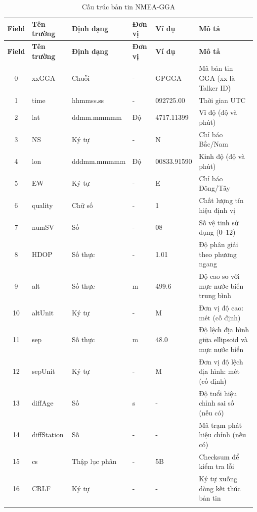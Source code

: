 \documentclass[../DoAn.tex]{subfiles}
\begin{document}
\begin{longtable}{|c|l|l|l|l|p{4cm}|}
\hline
\textbf{Field} & \textbf{Tên trường} & \textbf{Định dạng} & \textbf{Đơn vị} & \textbf{Ví dụ} & \textbf{Mô tả} \\
\hline
\endfirsthead

\hline
\textbf{Field} & \textbf{Tên trường} & \textbf{Định dạng} & \textbf{Đơn vị} & \textbf{Ví dụ} & \textbf{Mô tả} \\
\hline
\endhead

\hline
\endfoot

\endlastfoot

0 & xxGGA & Chuỗi & - & GPGGA & Mã bản tin GGA (xx là Talker ID) \\ \hline
1 & time & hhmmss.ss & - & 092725.00 & Thời gian UTC \\ \hline
2 & lat & ddmm.mmmmm & Độ & 4717.11399 & Vĩ độ (độ và phút) \\ \hline
3 & NS & Ký tự & - & N & Chỉ báo Bắc/Nam \\ \hline
4 & lon & dddmm.mmmmm & Độ & 00833.91590 & Kinh độ (độ và phút) \\ \hline
5 & EW & Ký tự & - & E & Chỉ báo Đông/Tây \\ \hline
6 & quality & Chữ số & - & 1 & Chất lượng tín hiệu định vị \\ \hline
7 & numSV & Số & - & 08 & Số vệ tinh sử dụng (0–12) \\ \hline
8 & HDOP & Số thực & - & 1.01 & Độ phân giải theo phương ngang \\ \hline
9 & alt & Số thực & m & 499.6 & Độ cao so với mực nước biển trung bình \\ \hline
10 & altUnit & Ký tự & - & M & Đơn vị độ cao: mét (cố định) \\ \hline
11 & sep & Số thực & m & 48.0 & Độ lệch địa hình giữa ellipsoid và mực nước biển \\ \hline
12 & sepUnit & Ký tự & - & M & Đơn vị độ lệch địa hình: mét (cố định) \\ \hline
13 & diffAge & Số & s & - & Độ tuổi hiệu chỉnh sai số (nếu có) \\ \hline
14 & diffStation & Số & - & - & Mã trạm phát hiệu chỉnh (nếu có) \\ \hline
15 & cs & Thập lục phân & - & 5B & Checksum để kiểm tra lỗi \\ \hline
16 & CRLF & Ký tự & - & - & Ký tự xuống dòng kết thúc bản tin \\ \hline

\caption{Cấu trúc bản tin NMEA-GGA} \\
\end{longtable}
\end{document}
